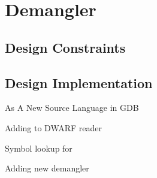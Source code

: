 \chapter{\CFAS Demangler} \label{demangler}

\section{Design Constraints}
\section{Design Implementation}
\CFAS As A New Source Language in GDB

Adding \CFAS to DWARF reader

Symbol lookup for \CFAS

Adding new demangler
